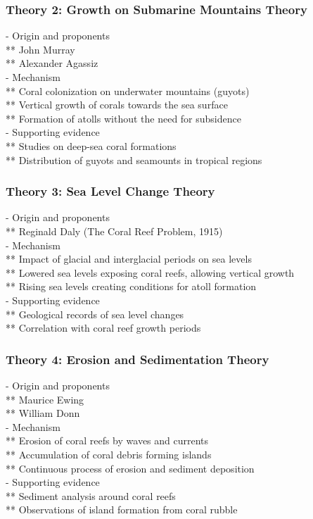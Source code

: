 \subsubsection{Theory 2: Growth on Submarine Mountains Theory}
- Origin and proponents \\
** John Murray \\
** Alexander Agassiz \\
- Mechanism \\
** Coral colonization on underwater mountains (guyots) \\
** Vertical growth of corals towards the sea surface \\
** Formation of atolls without the need for subsidence \\
- Supporting evidence \\
** Studies on deep-sea coral formations \\
** Distribution of guyots and seamounts in tropical regions

\subsubsection{Theory 3: Sea Level Change Theory}
- Origin and proponents \\
** Reginald Daly (The Coral Reef Problem, 1915) \\
- Mechanism \\
** Impact of glacial and interglacial periods on sea levels \\
** Lowered sea levels exposing coral reefs, allowing vertical growth \\
** Rising sea levels creating conditions for atoll formation \\
- Supporting evidence \\
** Geological records of sea level changes \\
** Correlation with coral reef growth periods

\subsubsection{Theory 4: Erosion and Sedimentation Theory}
- Origin and proponents \\
** Maurice Ewing \\
** William Donn \\
- Mechanism \\
** Erosion of coral reefs by waves and currents \\
** Accumulation of coral debris forming islands \\
** Continuous process of erosion and sediment deposition \\
- Supporting evidence \\
** Sediment analysis around coral reefs \\
** Observations of island formation from coral rubble

